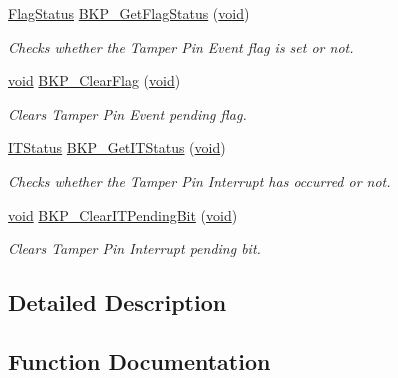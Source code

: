 \begin{DoxyCompactItemize}
\hyperlink{agilefox_2library_2inc_2stm32f10x__type_8h_a89136caac2e14c55151f527ac02daaff}{Flag\+Status} \hyperlink{group___b_k_p___private___functions_gacc9aedde760383f0bd146f0d77a547db}{B\+K\+P\+\_\+\+Get\+Flag\+Status} (\hyperlink{usb__devapi_8h_afabf60e7f57651d6d595a02c75f07cd0}{void})
\begin{DoxyCompactList}\small\item\em Checks whether the Tamper Pin Event flag is set or not. \end{DoxyCompactList}\item 
\hyperlink{usb__devapi_8h_afabf60e7f57651d6d595a02c75f07cd0}{void} \hyperlink{group___b_k_p___private___functions_ga3f3aea5b0a3d8d5d79b0b506928351ea}{B\+K\+P\+\_\+\+Clear\+Flag} (\hyperlink{usb__devapi_8h_afabf60e7f57651d6d595a02c75f07cd0}{void})
\begin{DoxyCompactList}\small\item\em Clears Tamper Pin Event pending flag. \end{DoxyCompactList}\item 
\hyperlink{agilefox_2library_2inc_2stm32f10x__type_8h_aacbd7ed539db0aacd973a0f6eca34074}{I\+T\+Status} \hyperlink{group___b_k_p___private___functions_ga99566c9f1f17f499020606cb63511494}{B\+K\+P\+\_\+\+Get\+I\+T\+Status} (\hyperlink{usb__devapi_8h_afabf60e7f57651d6d595a02c75f07cd0}{void})
\begin{DoxyCompactList}\small\item\em Checks whether the Tamper Pin Interrupt has occurred or not. \end{DoxyCompactList}\item 
\hyperlink{usb__devapi_8h_afabf60e7f57651d6d595a02c75f07cd0}{void} \hyperlink{group___b_k_p___private___functions_ga6a93ef8e40959bb10fea670e2040ad74}{B\+K\+P\+\_\+\+Clear\+I\+T\+Pending\+Bit} (\hyperlink{usb__devapi_8h_afabf60e7f57651d6d595a02c75f07cd0}{void})
\begin{DoxyCompactList}\small\item\em Clears Tamper Pin Interrupt pending bit. \end{DoxyCompactList}\end{DoxyCompactItemize}


\subsection{Detailed Description}


\subsection{Function Documentation}
